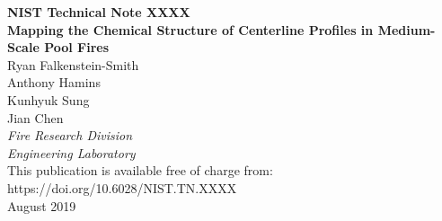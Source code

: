 \documentclass[12pt]{article}
\newcommand{\pubnumber}{XXXX}
\newcommand{\DOI}{https://doi.org/10.6028/NIST.TN.XXXX}
\newcommand{\monthyear}{August 2019}
\begin{document}
\begin{titlepage}
\begin{flushright}
\LARGE{\textbf{NIST Technical Note \pubnumber}}\\
\vfill 
\Huge{\textbf{Mapping the Chemical Structure of Centerline Profiles in Medium-Scale Pool Fires}}\\
\vfill
\normalsize Ryan Falkenstein-Smith\\
Anthony Hamins\\
Kunhyuk Sung\\
Jian Chen\\
\large
\textit{Fire Research Division}\\
\textit{Engineering Laboratory}\\
\vspace{12pt}
\vfill
\normalsize This publication is available free of charge from:\\
\DOI\\
\vfill
\normalsize \monthyear
\vfill


\end{flushright}
\end{titlepage}
\end{document}
